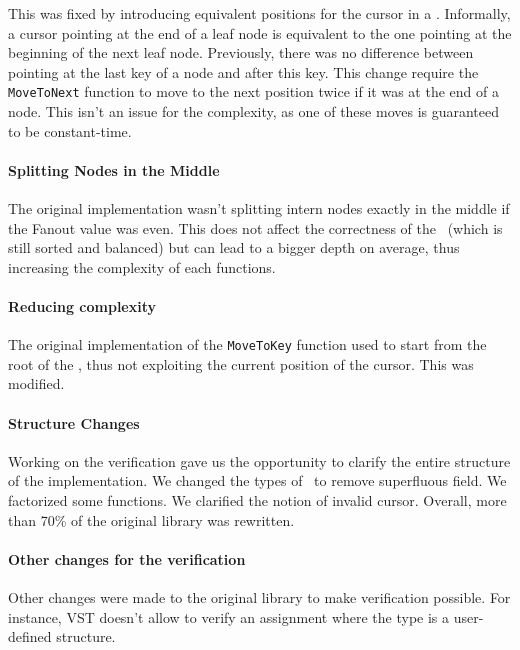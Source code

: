 This was fixed by introducing equivalent positions for the cursor in a \btree.
Informally, a cursor pointing at the end of a leaf node is equivalent to the one pointing at the beginning of the next leaf node.
Previously, there was no difference between pointing at the last key of a node and after this key.
This change require the \texttt{MoveToNext} function to move to the next position twice if it was at the end of a node.
This isn't an issue for the complexity, as one of these moves is guaranteed to be constant-time.

\paragraph{Splitting Nodes in the Middle}
The original implementation wasn't splitting intern nodes exactly in the middle if the Fanout value was even.
This does not affect the correctness of the \btree\ (which is still sorted and balanced) but can lead to a bigger depth on average, thus increasing the complexity of each functions.

\paragraph{Reducing complexity}
The original implementation of the \texttt{MoveToKey} function used to start from the root of the \btree, thus not exploiting the current position of the cursor. This was modified.

\paragraph{Structure Changes}
Working on the verification gave us the opportunity to clarify the entire structure of the implementation.
We changed the types of \btrees\ to remove superfluous field. We factorized some functions. We clarified the notion of invalid cursor.
Overall, more than 70\% of the original library was rewritten.

\paragraph{Other changes for the verification}
Other changes were made to the original library to make verification possible.
For instance, VST doesn't allow to verify an assignment where the type is a user-defined structure.


